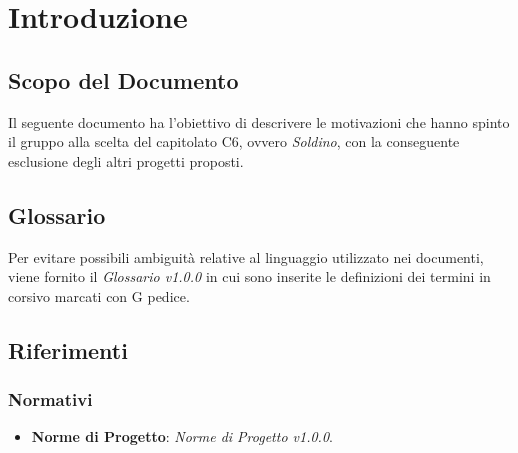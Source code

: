 \section{Introduzione}
\subsection{Scopo del Documento}
	Il seguente documento ha l'obiettivo di descrivere le motivazioni che hanno spinto il gruppo alla scelta del capitolato C6, ovvero \textit{Soldino}, con la conseguente esclusione degli altri progetti proposti.
	
\subsection{Glossario}
	Per evitare possibili ambiguità relative al linguaggio utilizzato nei documenti, viene fornito il \textit{Glossario v1.0.0} in cui sono inserite le definizioni dei termini in corsivo marcati con G pedice.
	
\subsection{Riferimenti}
\subsubsection{Normativi}
\begin{itemize}
	\item \textbf{Norme di Progetto}: \textit{Norme di Progetto v1.0.0}.
\end{itemize}
	

